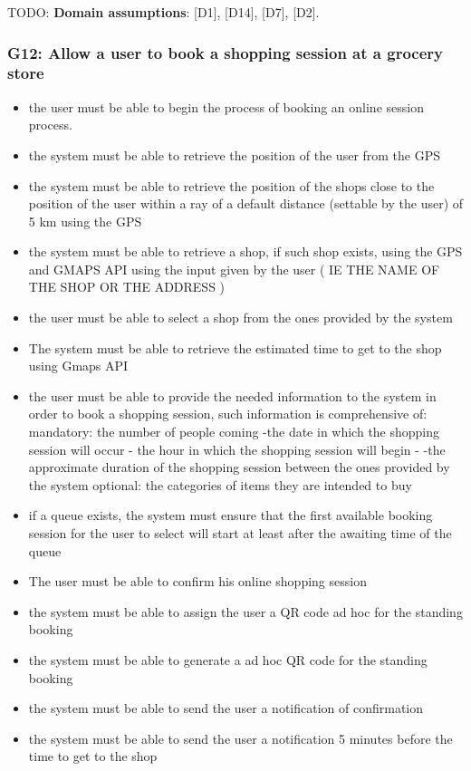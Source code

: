TODO: \textbf{Domain assumptions}: [D1], [D14], [D7], [D2].

\subsubsection{G12: Allow a user to book a shopping session at a grocery store}
\label{subsubsect:G12}

\begin{itemize}[topsep=0pt]
    \item the user must be able to begin the process of  booking an online session process.
    \item the system must be able to retrieve the position of the user from the GPS
    \item the system must be able to retrieve the position of the shops close to the position of the user within a ray of a default distance (settable by the user) of 5 km using the GPS
    \item the system must be able to retrieve a shop, if such shop exists, using the GPS  and GMAPS API using the input given by the user ( IE THE NAME OF THE SHOP OR THE ADDRESS )
    \item the user must be able to select a shop from the ones provided by the system
    \item The system must be able to retrieve the estimated time to get to the shop using Gmaps API
    \item the user must be able to provide the needed information to the system in order to book a shopping session, such information is comprehensive of:
    mandatory:
    the number of people coming
    -the date in which the shopping session will occur
    - the hour in which the shopping session will begin -
    -the approximate duration of the shopping session between the ones provided by the system
    optional:
    the categories of items they are intended to buy
    \item if a queue exists, the system must ensure that the first available booking session for the user to select will start at least after the awaiting time of the queue
    \item The user must be able to confirm his online shopping session
    \item the system must be able to assign the user a QR code ad hoc for the standing booking 
    \item the system must be able to generate a ad hoc QR code for the standing booking 
    \item the system must be able to send the user a notification of confirmation
    \item the system must be able to send the user a notification 5 minutes before the time to get to the shop 
\end{itemize}

